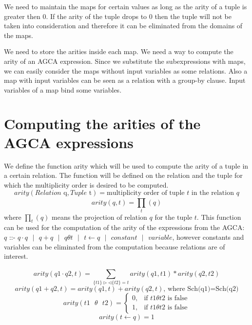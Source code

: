 \documentclass[12pt]{article}
\begin{document}
We need to maintain the maps for certain values as long as the arity of a tuple is greater then 0. If the arity  of the tuple drops to 0 then the tuple will not be taken into consideration and therefore it can be eliminated from the domains of the maps.

We need to store the arities inside each map. We need a way to compute the arity of an AGCA expression. Since we substitute the subexpressions with maps, we can easily consider the maps without input variables as some relations. Also a map with input variables can be seen as a relation with a group-by clause. Input variables of a map bind some variables.  
 
\section{Computing the arities of the AGCA expressions}
We define the function arity which will be used to compute the arity of a tuple in a certain relation. The function will be defined on the relation and the tuple for which the multiplicity order is desired to be computed. $$arity(Relation\text{ q},Tuple\text{ t})=\text{multiplicity order of tuple }t\text{ in the relation } q$$ $$arity(q,t)=\prod\limits_{t}^{}(q)$$ where $\prod\limits_{t}^{}(q)$ means the projection of relation $q$ for the tuple $t$. This function can be used for the computation of the arity of the expressions from the AGCA: $q\text{ ::- }q\cdot q\text{ }|\text{ }q+q\text{ }|\text{ }q \theta t\text{ }|\text{ }t\gets q\text{ }|\text{ }constant\text{ }|\text{ }variable$, however constants and variables can be eliminated from the computation because relations are of interest.

$$arity(q1\cdot q2,t)=\sum\limits_{\{t1\}\triangleright \triangleleft \{t2\}={t}}^{}arity(q1,t1)*arity(q2,t2)$$
$$arity(q1 + q2,t)=arity(q1,t)+arity(q2,t)\text{, where Sch(q1)=Sch(q2)} $$
$$arity(t1\text{ } \theta \text{ } t2)=\begin{cases}0,& \mbox{if } t1\theta t2 \mbox{ is false}\\ 1,& \mbox{if } t1\theta t2 \mbox{ is false} \end{cases}$$
$$arity(t\gets q)=1$$
\end{document}
